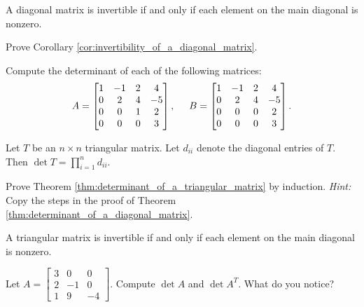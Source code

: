\documentclass[12pt,letterpaper,reqno]{article}
\numberwithin{equation}{section}
\begin{document}
\begin{cor}\label{cor:invertibility_of_a_diagonal_matrix}
	A diagonal matrix is invertible if and only if each element on the main diagonal is nonzero.
\end{cor}

\begin{exercise}
Prove Corollary	\ref{cor:invertibility_of_a_diagonal_matrix}.
\end{exercise}

\begin{exercise}
Compute the determinant of each of the following matrices:
\begin{align*}
	A=\begin{bmatrix}
		1 & -1 & 2 & 4 \\
		0 & 2 & 4 & -5 \\
		0 & 0 & 1 & 2 \\
		0 & 0 & 0 & 3
	\end{bmatrix}, \hspace{0.5cm} B=\begin{bmatrix}
		1 & -1 & 2 & 4 \\
		0 & 2 & 4 & -5 \\
		0 & 0 & 0 & 2 \\
		0 & 0 & 0 & 3
	\end{bmatrix}.
\end{align*}	
\end{exercise}

\begin{thm}\label{thm:determinant_of_a_triangular_matrix}
	Let $T$ be an $n \times n$ triangular matrix. Let $d_{ii}$ denote the diagonal entries of $T$. Then $\det T=\prod_{i=1}^n d_{ii}$.
\end{thm}

\begin{exercise}
	Prove Theorem \ref{thm:determinant_of_a_triangular_matrix} by induction. \emph{Hint:} Copy the steps in the proof of Theorem \ref{thm:determinant_of_a_diagonal_matrix}.
\end{exercise}

\begin{cor}
	A triangular matrix is invertible if and only if each element on the main diagonal is nonzero.
\end{cor}

\begin{exercise}
Let $A=\begin{bmatrix}
	3 & 0 & 0 \\
	2 & -1 & 0 \\
	1 & 9 & -4
\end{bmatrix}$. Compute $\det A$ and $\det A^T$. What do you notice?	
\end{exercise}
\end{document}
